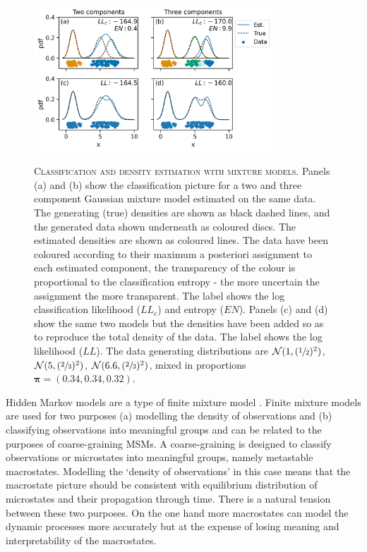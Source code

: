 \begin{figure}
    \centering
    \caption[Classification and density estimation with mixture models]{\textsc{Classification and density estimation with mixture models}. Panels (a) and (b) show the classification picture for a two and three component Gaussian mixture model estimated on the same data. The generating (true) densities are shown as black dashed lines, and the generated data shown underneath as coloured discs. The estimated densities are shown as coloured lines. The data have been coloured according to their maximum a posteriori assignment to each estimated component, the transparency of the colour is proportional to the classification entropy - the more uncertain the assignment the more transparent. The label shows the log classification likelihood ($LL_{\mathrm{c}}$) and entropy ($EN$). Panels (c) and (d) show the same two models but the densities have been added so as to reproduce the total density of the data. The label shows the log likelihood ($LL$). The data generating distributions are $\mathcal{N}(1, (\sfrac{1}{2})^{2})$, $\mathcal{N}(5, (\sfrac{2}{3})^{2})$, $\mathcal{N}(6.6, (\sfrac{2}{3})^{2})$, mixed in proportions $\bm{\pi}=(0.34, 0.34, 0.32)$.}
    \includegraphics[width=0.8\textwidth]{chapters/hmm_selection/figures/class_like_explainer.png}
    \label{fig:hmm_class_lik_explainer}
\end{figure}

Hidden Markov models are a type of finite mixture model \cite{mclachlanFiniteMixtureModels2000}. Finite mixture models are used for two purposes (a) modelling the density of observations and (b) classifying observations into meaningful groups \cite{mclachlan1988mixture} and can be related to the purposes of coarse-graining MSMs. A coarse-graining is designed to classify observations or microstates into meaningful groups, namely metastable macrostates.  Modelling the `density of observations' in this case means that the macrostate picture should be consistent with equilibrium distribution of microstates and their propagation through time. There is a natural tension between these two purposes.  On the one hand more macrostates can model the dynamic processes more accurately but at the expense of losing meaning and interpretability of the macrostates.  

